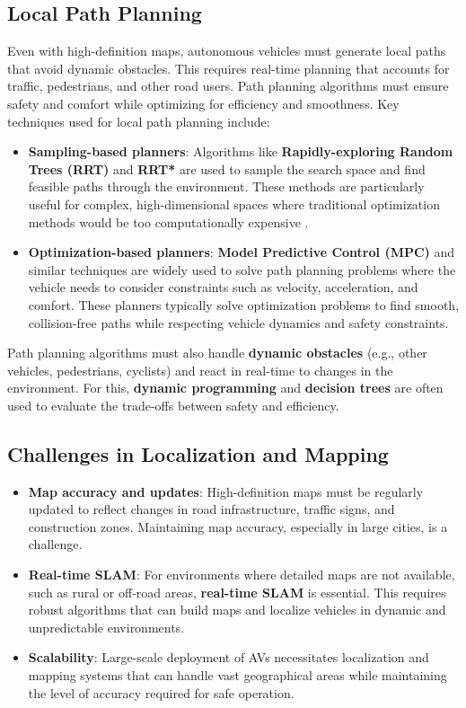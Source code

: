 \documentclass[12pt,a4paper]{article}
\begin{document}
\subsection{Local Path Planning}
Even with high-definition maps, autonomous vehicles must generate local paths that avoid dynamic obstacles. This requires real-time planning that accounts for traffic, pedestrians, and other road users. Path planning algorithms must ensure safety and comfort while optimizing for efficiency and smoothness. Key techniques used for local path planning include:
\begin{itemize}
    \item \textbf{Sampling-based planners}: Algorithms like \textbf{Rapidly-exploring Random Trees (RRT)} and \textbf{RRT*} are used to sample the search space and find feasible paths through the environment. These methods are particularly useful for complex, high-dimensional spaces where traditional optimization methods would be too computationally expensive \cite{gammell2014informed}.
    \item \textbf{Optimization-based planners}: \textbf{Model Predictive Control (MPC)} and similar techniques are widely used to solve path planning problems where the vehicle needs to consider constraints such as velocity, acceleration, and comfort. These planners typically solve optimization problems to find smooth, collision-free paths while respecting vehicle dynamics and safety constraints.
\end{itemize}

Path planning algorithms must also handle \textbf{dynamic obstacles} (e.g., other vehicles, pedestrians, cyclists) and react in real-time to changes in the environment. For this, \textbf{dynamic programming} and \textbf{decision trees} are often used to evaluate the trade-offs between safety and efficiency.

\subsection{Challenges in Localization and Mapping}
\begin{itemize}
    \item \textbf{Map accuracy and updates}: High-definition maps must be regularly updated to reflect changes in road infrastructure, traffic signs, and construction zones. Maintaining map accuracy, especially in large cities, is a challenge.
    \item \textbf{Real-time SLAM}: For environments where detailed maps are not available, such as rural or off-road areas, \textbf{real-time SLAM} is essential. This requires robust algorithms that can build maps and localize vehicles in dynamic and unpredictable environments.
    \item \textbf{Scalability}: Large-scale deployment of AVs necessitates localization and mapping systems that can handle vast geographical areas while maintaining the level of accuracy required for safe operation.
\end{itemize}
\end{document}
